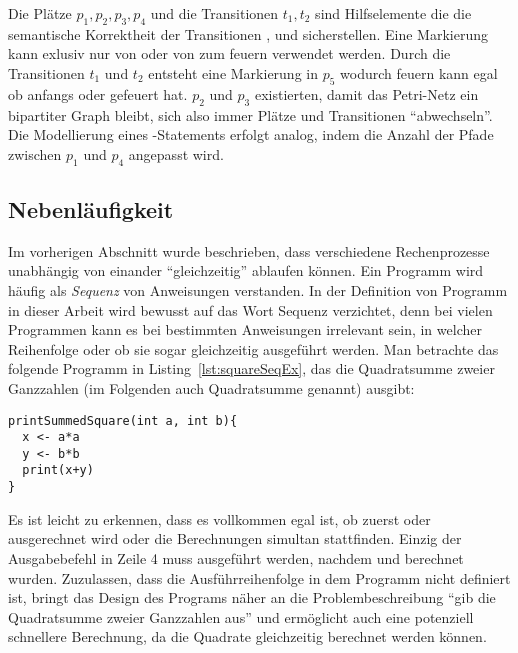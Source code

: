 Die Plätze $p_1,p_2,p_3,p_4$ und die Transitionen $t_1,t_2$ sind Hilfselemente die die semantische Korrektheit der Transitionen ,  und  sicherstellen. Eine Markierung kann exlusiv nur von  oder von  zum feuern verwendet werden. Durch die Transitionen $t_1$ und $t_2$ entsteht eine Markierung in $p_5$ wodurch  feuern kann egal ob anfangs  oder  gefeuert hat. $p_2$ und $p_3$ existierten, damit das Petri-Netz ein bipartiter Graph bleibt, sich also immer Plätze und Transitionen \enquote{abwechseln}. Die Modellierung eines -Statements erfolgt analog, indem die Anzahl der Pfade zwischen $p_1$ und $p_4$ angepasst wird.

\subsection{Nebenläufigkeit}\label{sec:nebenl}
Im vorherigen Abschnitt wurde beschrieben, dass verschiedene Rechenprozesse unabhängig von einander \enquote{gleichzeitig} ablaufen können. Ein Programm wird häufig als \emph{Sequenz} von Anweisungen verstanden. In der Definition von Programm in dieser Arbeit wird bewusst auf das Wort Sequenz verzichtet, denn bei vielen Programmen kann es bei bestimmten Anweisungen irrelevant sein, in welcher Reihenfolge oder ob sie sogar gleichzeitig ausgeführt werden. Man betrachte das folgende Programm in Listing~\ref{lst:squareSeqEx}, das die Quadratsumme zweier Ganzzahlen (im Folgenden auch Quadratsumme genannt) ausgibt: 
\begin{lstlisting}[caption={Beispiel eines Programms das die Summe von Quadraten zweier Ganzzahlen berechnet. Die Berechnung der Quadratzahlen wird nacheinander in einer fest definierten Sequenz durchgeführt.}, label={lst:squareSeqEx}]
printSummedSquare(int a, int b){
  x <- a*a
  y <- b*b
  print(x+y)
}
\end{lstlisting}
Es ist leicht zu erkennen, dass es vollkommen egal ist, ob zuerst  oder  ausgerechnet wird oder die Berechnungen simultan stattfinden. Einzig der Ausgabebefehl in Zeile 4 muss ausgeführt werden, nachdem  und  berechnet wurden. Zuzulassen, dass die Ausführreihenfolge in dem Programm nicht definiert ist, bringt das Design des Programs näher an die Problembeschreibung \enquote{gib die Quadratsumme zweier Ganzzahlen aus} und ermöglicht auch eine potenziell schnellere Berechnung, da die Quadrate gleichzeitig berechnet werden können.

